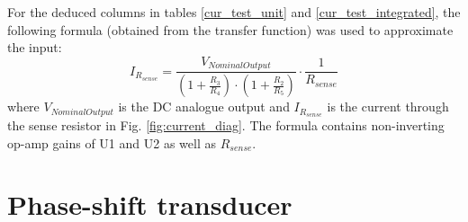 For the deduced columns in tables \ref{cur_test_unit} and \ref{cur_test_integrated}, the following formula (obtained from the transfer function) was used to approximate the input:
\begin{equation}
    I_{R_{sense}}=\frac{V_{Nominal Output}}{(1+\frac{R_3}{R_4})\cdot(1+\frac{R_2}{R_5})}\cdot \frac{1}{R_{sense}}
    \label{eq:delta_current}
\end{equation}
where $V_{Nominal Output}$ is the DC analogue output and $I_{R_{sense}}$ is the current through the sense resistor in Fig. \ref{fig:current_diag}. The formula contains non-inverting op-amp gains of U1 and U2 as well as $R_{sense}$.



\section{Phase-shift transducer}\label{sec:ptrans}

